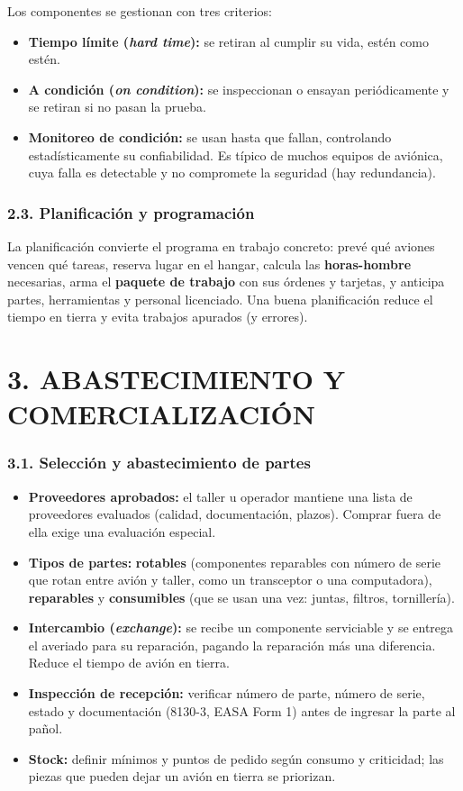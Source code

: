 Los componentes se gestionan con tres criterios:
\begin{itemize}
  \item \textbf{Tiempo límite (\textit{hard time}):} se retiran al cumplir su vida, estén como
        estén.
  \item \textbf{A condición (\textit{on condition}):} se inspeccionan o ensayan periódicamente y
        se retiran si no pasan la prueba.
  \item \textbf{Monitoreo de condición:} se usan hasta que fallan, controlando estadísticamente su
        confiabilidad. Es típico de muchos equipos de aviónica, cuya falla es detectable y no
        compromete la seguridad (hay redundancia).
\end{itemize}

\subsubsection*{2.3. Planificación y programación}
La planificación convierte el programa en trabajo concreto: prevé qué aviones vencen qué tareas,
reserva lugar en el hangar, calcula las \textbf{horas-hombre} necesarias, arma el \textbf{paquete
de trabajo} con sus órdenes y tarjetas, y anticipa partes, herramientas y personal licenciado. Una
buena planificación reduce el tiempo en tierra y evita trabajos apurados (y errores).

\section*{3. ABASTECIMIENTO Y COMERCIALIZACIÓN}

\subsubsection*{3.1. Selección y abastecimiento de partes}
\begin{itemize}
  \item \textbf{Proveedores aprobados:} el taller u operador mantiene una lista de proveedores
        evaluados (calidad, documentación, plazos). Comprar fuera de ella exige una evaluación
        especial.
  \item \textbf{Tipos de partes:} \textbf{rotables} (componentes reparables con número de serie que
        rotan entre avión y taller, como un transceptor o una computadora), \textbf{reparables} y
        \textbf{consumibles} (que se usan una vez: juntas, filtros, tornillería).
  \item \textbf{Intercambio (\textit{exchange}):} se recibe un componente serviciable y se entrega
        el averiado para su reparación, pagando la reparación más una diferencia. Reduce el
        tiempo de avión en tierra.
  \item \textbf{Inspección de recepción:} verificar número de parte, número de serie, estado y
        documentación (8130-3, EASA Form 1) antes de ingresar la parte al pañol.
  \item \textbf{Stock:} definir mínimos y puntos de pedido según consumo y criticidad; las piezas
        que pueden dejar un avión en tierra se priorizan.
\end{itemize}

